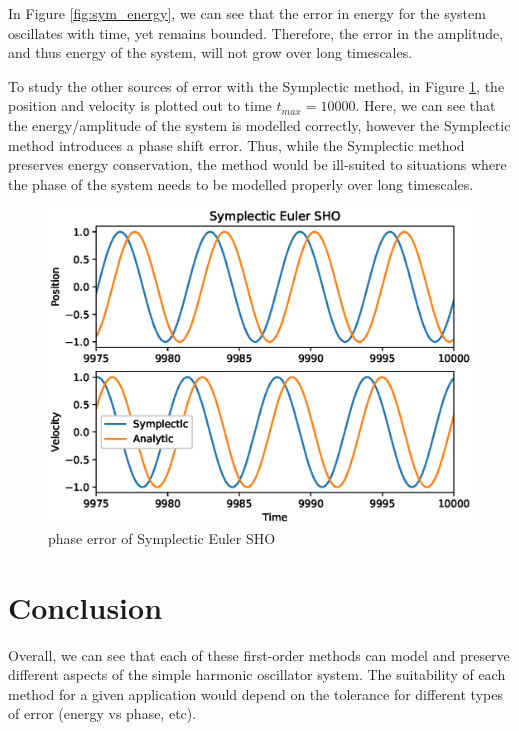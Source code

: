 \documentclass{article}
\begin{document}
In Figure \ref{fig:sym_energy}, we can see that the error in energy for the system oscillates with time, yet remains bounded.  Therefore, the error in the amplitude, and thus energy of the system, will not grow over long timescales.  

\newpage

To study the other sources of error with the Symplectic method, in Figure \ref{fig:sym_plot}, the position and velocity is plotted out to time $t_{max} = 10000$.  Here, we can see that the energy/amplitude of the system is modelled correctly, however the Symplectic method introduces a phase shift error.  Thus, while the Symplectic method preserves energy conservation, the method would be ill-suited to situations where the phase of the system needs to be modelled properly over long timescales.  

\begin{figure}[h!]
\centering
\includegraphics[scale=0.75]{fig/symplectic_plot.eps}
\caption{phase error of Symplectic Euler SHO}
\label{fig:sym_plot}
\end{figure}

\section{Conclusion}
Overall, we can see that each of these first-order methods can model and preserve different aspects of the simple harmonic oscillator system.  The suitability of each method for a given application would depend on the tolerance for different types of error (energy vs phase, etc).  
\end{document}
